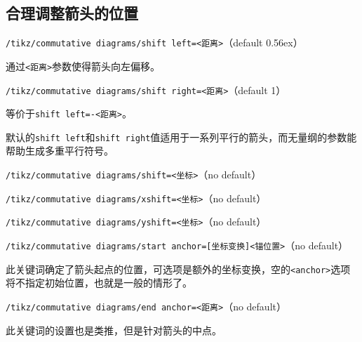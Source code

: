\documentclass{ctexart}
\begin{document}
\subsection{合理调整箭头的位置}
{\color{red}\texttt{/tikz/commutative diagrams/shift left=<距离>}}\hfill （default 0.56ex）\par
通过\verb|<距离>|参数使得箭头向左偏移。
\par {\color{red}\texttt{/tikz/commutative diagrams/shift right=<距离>}}\hfill （default 1）\par 等价于\verb|shift left=-<距离>|。
\begin{tcblisting}{}
\end{tcblisting}
\par 默认的\verb|shift left|和\verb|shift right|值适用于一系列平行的箭头，而无量纲的参数能帮助生成多重平行符号。
\begin{tcblisting}{}
\end{tcblisting}
\par {\color{red}\texttt{/tikz/commutative diagrams/shift=<坐标>}}\hfill （no default）
\par {\color{red}\texttt{/tikz/commutative diagrams/xshift=<坐标>}}\hfill （no default）
\par {\color{red}\texttt{/tikz/commutative diagrams/yshift=<坐标>}}\hfill （no default）
\begin{tcblisting}{}
\end{tcblisting}
\par {\color{red}\texttt{/tikz/commutative diagrams/start anchor={[坐标变换]<锚位置>}}}\hfill （no default）
\par 此关键词确定了箭头起点的位置，可选项是额外的坐标变换，空的\verb|<anchor>|选项将不指定初始位置，也就是一般的情形了。
\par {\color{red}\texttt{/tikz/commutative diagrams/end anchor=<距离>}}\hfill （no default）\par
此关键词的设置也是类推，但是针对箭头的中点。
\end{document}
